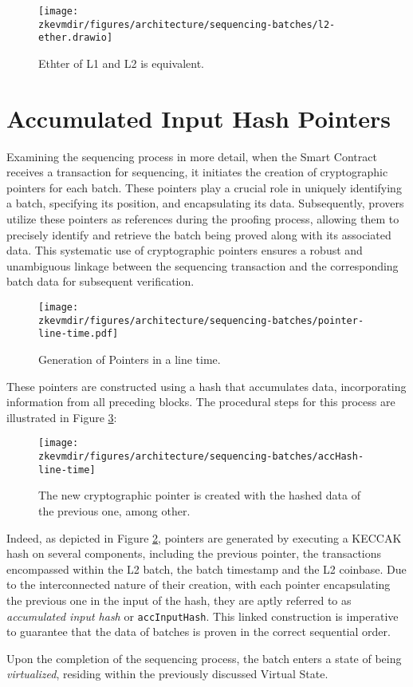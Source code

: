 \begin{figure}[H]
\centering
\texttt{[image: \\zkevmdir/figures/architecture/sequencing-batches/l2-ether.drawio]}
\caption{Ethter of L1 and L2 is equivalent.}
\label{fig:ether}
\end{figure} 




\section{Accumulated Input Hash Pointers}

Examining the sequencing process in more detail, when the Smart Contract receives a transaction for sequencing, it initiates the creation of cryptographic pointers for each batch. These pointers play a crucial role in uniquely identifying a batch, specifying its position, and encapsulating its data. Subsequently, provers utilize these pointers as references during the proofing process, allowing them to precisely identify and retrieve the batch being proved along with its associated data. This systematic use of cryptographic pointers ensures a robust and unambiguous linkage between the sequencing transaction and the corresponding batch data for subsequent verification.

\begin{figure}[H]
\centering
\texttt{[image: \\zkevmdir/figures/architecture/sequencing-batches/pointer-line-time.pdf]}
\caption{Generation of Pointers in a line time.}
\label{fig:pointer-line-time}
\end{figure} 

These pointers are constructed using a hash that accumulates data, incorporating information from all preceding blocks. The procedural steps for this process are illustrated in Figure \ref{fig:accinputhash-pointers}:

\begin{figure}[H]
\centering
\texttt{[image: \\zkevmdir/figures/architecture/sequencing-batches/accHash-line-time]}
\caption{The new cryptographic pointer is created with the hashed data of the previous one, among other.}
\label{fig:accinputhash-pointers}
\end{figure} 

Indeed, as depicted in Figure \ref{fig:pointer-line-time}, pointers are generated by executing a KECCAK hash on several components, including the previous pointer, the transactions encompassed within the L2 batch, the batch timestamp and the L2 coinbase. Due to the interconnected nature of their creation, with each pointer encapsulating the previous one in the input of the hash, they are aptly referred to as \textit{accumulated input hash} or \texttt{accInputHash}. This linked construction is imperative to guarantee that the data of batches is proven in the correct sequential order.


Upon the completion of the sequencing process, the batch enters a state of being \textit{virtualized}, residing within the previously discussed Virtual State. 







